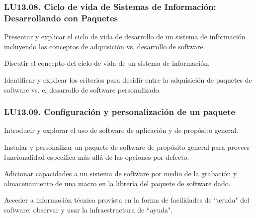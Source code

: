 \subsubsection{LU13.08. Ciclo de vida de Sistemas de Información: Desarrollando con Paquetes}\label{sec:LU13.08}
\begin{LearningUnit}
\begin{LUGoal}
\item Presentar y explicar el ciclo de vida de desarrollo de un sistema de información incluyendo los conceptos de adquisición vs. desarrollo de software.
\end{LUGoal}

\begin{LUObjective}
\item Discutir el concepto del ciclo de vida de un sistema de información.
\item Identificar y explicar los criterios para decidir entre la adquisición de paquetes de software vs. el desarrollo de software personalizado.
\end{LUObjective}
\end{LearningUnit}

\subsubsection{LU13.09. Configuración y personalización de un paquete}\label{sec:LU13.09}
\begin{LearningUnit}
\begin{LUGoal}
\item Introducir y explorar el uso de software de aplicación y de propósito general.
\end{LUGoal}

\begin{LUObjective}
\item Instalar y personalizar un paquete de software de propósito general para proveer funcionalidad específica más allá de las opciones por defecto.
\item Adicionar capacidades a un sistema de software por medio de la grabación y almacenamiento de una macro en la librería del paquete de software dado.
\item Acceder a información técnica provista en la forma de facilidades de ``ayuda" del software; observar y usar la infraestructura de ``ayuda".
\end{LUObjective}
\end{LearningUnit}

